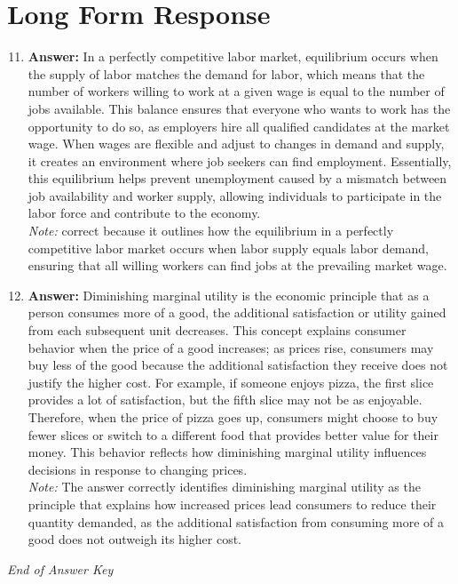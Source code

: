 \documentclass[12pt]{article}
\begin{document}
\section*{Long Form Response}
\begin{enumerate}[label=\arabic*.]
\setcounter{enumi}{10}
\item \textbf{Answer:} In a perfectly competitive labor market, equilibrium occurs when the supply of labor matches the demand for labor, which means that the number of workers willing to work at a given wage is equal to the number of jobs available. This balance ensures that everyone who wants to work has the opportunity to do so, as employers hire all qualified candidates at the market wage. When wages are flexible and adjust to changes in demand and supply, it creates an environment where job seekers can find employment. Essentially, this equilibrium helps prevent unemployment caused by a mismatch between job availability and worker supply, allowing individuals to participate in the labor force and contribute to the economy.
\\ \textit{Note:} correct because it outlines how the equilibrium in a perfectly competitive labor market occurs when labor supply equals labor demand, ensuring that all willing workers can find jobs at the prevailing market wage.
\item \textbf{Answer:} Diminishing marginal utility is the economic principle that as a person consumes more of a good, the additional satisfaction or utility gained from each subsequent unit decreases. This concept explains consumer behavior when the price of a good increases; as prices rise, consumers may buy less of the good because the additional satisfaction they receive does not justify the higher cost. For example, if someone enjoys pizza, the first slice provides a lot of satisfaction, but the fifth slice may not be as enjoyable. Therefore, when the price of pizza goes up, consumers might choose to buy fewer slices or switch to a different food that provides better value for their money. This behavior reflects how diminishing marginal utility influences decisions in response to changing prices.
\\ \textit{Note:} The answer correctly identifies diminishing marginal utility as the principle that explains how increased prices lead consumers to reduce their quantity demanded, as the additional satisfaction from consuming more of a good does not outweigh its higher cost.
\end{enumerate}

\vfill
\noindent\textit{End of Answer Key}
\end{document}
